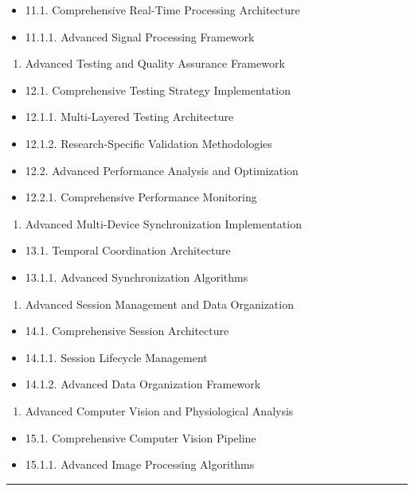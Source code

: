 \documentclass[11pt,a4paper]{report}
\begin{document}
\begin{itemize}
\item 11.1. Comprehensive Real-Time Processing Architecture
\item 11.1.1. Advanced Signal Processing Framework
\end{itemize}
\begin{enumerate}
\item Advanced Testing and Quality Assurance Framework
\end{enumerate}
\begin{itemize}
\item 12.1. Comprehensive Testing Strategy Implementation
\item 12.1.1. Multi-Layered Testing Architecture
\item 12.1.2. Research-Specific Validation Methodologies
\item 12.2. Advanced Performance Analysis and Optimization
\item 12.2.1. Comprehensive Performance Monitoring
\end{itemize}
\begin{enumerate}
\item Advanced Multi-Device Synchronization Implementation
\end{enumerate}
\begin{itemize}
\item 13.1. Temporal Coordination Architecture
\item 13.1.1. Advanced Synchronization Algorithms
\end{itemize}
\begin{enumerate}
\item Advanced Session Management and Data Organization
\end{enumerate}
\begin{itemize}
\item 14.1. Comprehensive Session Architecture
\item 14.1.1. Session Lifecycle Management
\item 14.1.2. Advanced Data Organization Framework
\end{itemize}
\begin{enumerate}
\item Advanced Computer Vision and Physiological Analysis
\end{enumerate}
\begin{itemize}
\item 15.1. Comprehensive Computer Vision Pipeline
\item 15.1.1. Advanced Image Processing Algorithms

\end{itemize}
\hrule
\end{document}
